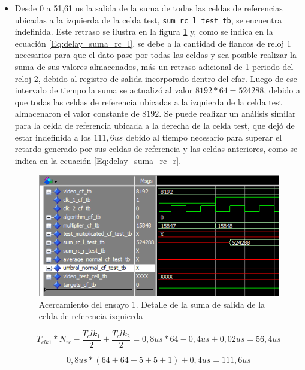 \begin{itemize}
\item
Desde 0 a 51,61 us la salida de la suma de todas las celdas de referencias ubicadas a la izquierda de la celda test, \texttt{sum\_rc\_l\_test\_tb}, se encuentra indefinida. Este retraso se ilustra en la figura \ref{fig:cfar_ensayo_1_zoom_sum_rc} y, como se indica en la ecuación \ref{Eq:delay_suma_rc_l}, se debe a la cantidad de flancos de reloj 1 necesarios para que el dato pase por todas las celdas y sea posible realizar la suma de sus valores almacenados, más un retraso adicional de 1 periodo del reloj 2, debido al registro de salida incorporado dentro del cfar. Luego de ese intervalo de tiempo la suma se actualizó al valor $8192 * 64 = 524288$, debido a que todas las celdas de referencia ubicadas a la izquierda de la celda test almacenaron el valor constante de $8192$. Se puede realizar un análisis similar para la celda de referencia ubicada a la derecha de la celda test, que dejó de estar indefinida a los $111,6 us$ debido al tiempo necesario para superar el retardo generado por sus celdas de referencia y las celdas anteriores, como se indica en la ecuación \ref{Eq:delay_suma_rc_r}.

\begin{figure}
\centering
\includegraphics[scale=1]{./Figures/cfar_ensayo_1_zoom_sum_rc.png}
\caption{Acercamiento del ensayo 1. Detalle de la suma de salida de la celda de referencia izquierda}
\label{fig:cfar_ensayo_1_zoom_sum_rc}
\end{figure}

\begin{equation}
T_{clk 1} * N_{rc} - \dfrac{T_clk_1}{2} + \dfrac{T_clk_2}{2} = 0,8 us * 64 - 0,4 us + 0,02 us= 56,4 us
\label{Eq:delay_suma_rc_l}
\end{equation}


\begin{equation}
0,8 us *(64 + 64 + 5 + 5 + 1) + 0,4 us = 111,6 us
\label{Eq:delay_suma_rc_r}
\end{equation}


\end{itemize}

